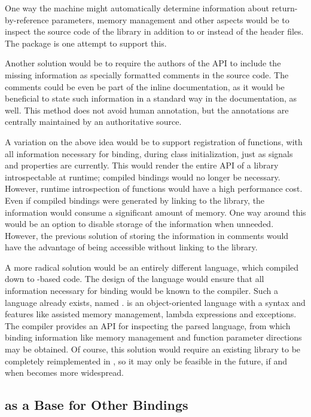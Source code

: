 \documentclass[article]{jss}
\begin{document}
One way the machine might automatically determine information about
return-by-reference parameters, memory management and other aspects
would be to inspect the  source code of the library in addition to
or instead of the header files. The  package \citep*{RGCCTU}
is one attempt to support this.

Another solution would be to require the authors of the API to include the 
missing information as specially formatted comments in the source code. The
comments could be even be part of the inline documentation, as it would be
beneficial to state such information in a standard way in the
documentation, as well. This method does not avoid human annotation, but
the annotations are centrally maintained by an authoritative source. 

A variation on the above idea would be to support registration of
functions, with all information necessary for binding, during class 
initialization, just as signals and properties are currently. This would render
the entire API of a library introspectable at runtime; compiled bindings would
no longer be necessary. However, runtime introspection of functions would
have a high performance cost. Even if compiled bindings were generated by
linking to the library, the information would consume a significant amount of 
memory. One way around this would be an option to disable storage of the
information when unneeded. However, the previous solution of storing
the information in comments would have the advantage of being accessible
without linking to the library.

A more radical solution would be an entirely different language, which
compiled down to -based  code. The design of the
language would ensure that all information necessary for binding would
be known to the compiler. Such a language already exists, named  \citep{vala}. 
 is an object-oriented language with
a  syntax and features like assisted memory management, lambda expressions and 
exceptions. The  compiler provides an API for inspecting
the parsed language, from which binding information like memory management
and function parameter directions may be obtained. Of course, this
solution would require an existing library to be completely reimplemented in
, so it may only be feasible in the future, if and when
 becomes more widespread.

\subsection[RGtk2 as a Base for Other GObject Bindings]{ as a Base for Other  Bindings}
\end{document}
